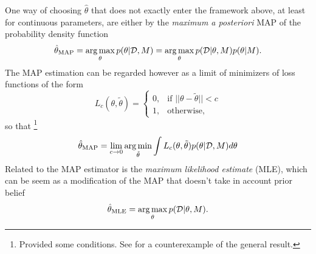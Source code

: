 One way of choosing $\hat{\theta}$ that does not exactly enter the framework above, at least for continuous parameters, are either by the \textit{maximum a posteriori} MAP of the probability density function
\begin{equation}\label{map_definition}
 \hat{\theta}_{\text{MAP}} = \operatorname*{arg\,max}_\theta p(\theta | \mathcal{D},M) = 
       \operatorname*{arg\,max}_\theta p(\mathcal{D} | \theta,M) p(\theta | M).
\end{equation}
The MAP estimation can be regarded however as a limit of minimizers of loss functions of the form
\begin{equation}
L_c(\theta,\tilde{\theta}) = 
\begin{cases}
0, & \text{if } ||\theta - \tilde{\theta}|| < c \\
1, & \text{otherwise},
\end{cases}
\end{equation}
so that \footnote{Provided some conditions. See \cite{Bassett_2018} for a counterexample of the general result.}
\begin{equation}
\hat{\theta}_{\text{MAP}} = \lim_{c \to 0} \operatorname*{arg\,min}_{\tilde{\theta}} \int L_c(\theta,\tilde{\theta}) p(\theta|\mathcal{D},M) d \theta
\end{equation}
Related to the MAP estimator is the \textit{maximum likelihood estimate} (MLE), which can be seem as a modification of the MAP that doesn't take in account prior belief 
\begin{equation}\label{mle_definition}
\hat{\theta}_{\text{MLE}} = \operatorname*{arg\,max}_\theta  p(\mathcal{D} | \theta, M).
\end{equation}

